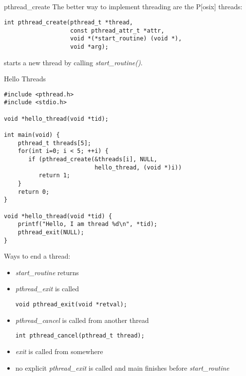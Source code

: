 \subsection{}
\begin{frame}[fragile]{pthread\_create}
    The better way to implement threading are the P[osix] threads:
    \bigskip
    \begin{lstlisting}[numbers=none]
int pthread_create(pthread_t *thread,
                   const pthread_attr_t *attr,
                   void *(*start_routine) (void *),
                   void *arg);
\end{lstlisting}
    starts a new thread by calling \textit{start\_routine()}.
\end{frame}

\begin{frame}[fragile]{Hello Threads}
    \begin{lstlisting}
#include <pthread.h>
#include <stdio.h>

void *hello_thread(void *tid);

int main(void) {
    pthread_t threads[5];
    for(int i=0; i < 5; ++i) {
       if (pthread_create(&threads[i], NULL,
                          hello_thread, (void *)i))
          return 1;
    }
    return 0;
}

void *hello_thread(void *tid) {
    printf("Hello, I am thread %d\n", *tid);
    pthread_exit(NULL);
}
\end{lstlisting}
\end{frame}
\begin{frame}[fragile]{Ways to end a thread:}
    \begin{itemize}
        \item \textit{start\_routine} returns
        \item \textit{pthread\_exit} is called
        \begin{lstlisting}[numbers=none]
void pthread_exit(void *retval);
\end{lstlisting}
        \item \textit{pthread\_cancel} is called from another thread
        \begin{lstlisting}[numbers=none]
int pthread_cancel(pthread_t thread);
\end{lstlisting}
        \item \textit{exit} is called from somewhere
        \bigskip
        \item no explicit \textit{pthread\_exit} is called and main  finishes before \textit{start\_routine}
    \end{itemize}
\end{frame}
